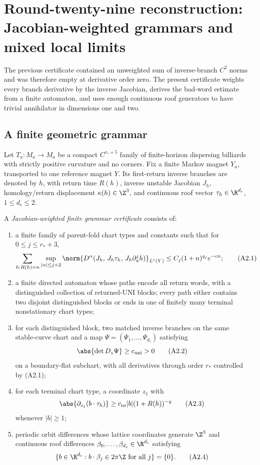 \section{Round-twenty-nine reconstruction: Jacobian-weighted grammars and mixed local limits}
\label{sec:r29-a2}

The previous certificate contained an unweighted sum of inverse-branch
$C^2$ norms and was therefore empty at derivative order zero.  The present
certificate weights every branch derivative by the inverse Jacobian, derives
the bad-word estimate from a finite automaton, and uses enough continuous roof
generators to have trivial annihilator in dimensions one and two.

\subsection{A finite geometric grammar}

Let $T_a:M_a\to M_a$ be a compact $C^{r_*+5}$ family of finite-horizon
dispersing billiards with strictly positive curvature and no corners.  Fix a
finite Markov magnet $Y_a$, transported to one reference magnet $Y$.  Its
first-return inverse branches are denoted by $h$, with return time $R(h)$,
inverse unstable Jacobian $J_h$, homology/return displacement
$\kappa(h)\in\Z^3$, and continuous roof vector $\tau_h\in\R^{d_c}$,
$1\le d_c\le2$.

A \emph{Jacobian-weighted finite grammar certificate} consists of:

\begin{enumerate}[label=(G\arabic*)]
\item a finite family of parent-fold chart types and constants such that for
      $0\le j\le r_*+3$,
\[
 \sum_{h:R(h)=n}\sup_{|\alpha|\le j+2}
 \norm{D^\alpha(J_h,\,J_h\tau_h,\,J_h\partial_a^jh)}_{L^1(Y)}
 \le C_j(1+n)^{q_j}e^{-cn};                               \tag{A2.1}
\]
\item a finite directed automaton whose paths encode all return words, with a
      distinguished collection of returned-UNI blocks; every path either
      contains two disjoint distinguished blocks or ends in one of finitely
      many terminal nonstationary chart types;
\item for each distinguished block, two matched inverse branches on the same
      stable-curve chart and a map
      $\Psi=(\Psi_1,\ldots,\Psi_{d_c})$ satisfying
\[
 \abs{\det D_z\Psi}\ge c_{\rm uni}>0                     \tag{A2.2}
\]
      on a boundary-flat subchart, with all derivatives through order $r_*$
      controlled by (A2.1);
\item for each terminal chart type, a coordinate $z_1$ with
\[
 \abs{\partial_{z_1}(b\cdot\tau_h)}
 \ge c_{\rm ns}|b|(1+R(h))^{-q}                           \tag{A2.3}
\]
      whenever $|b|\ge1$;
\item periodic orbit differences whose lattice coordinates generate $\Z^3$
      and continuous roof differences
      $\beta_0,\ldots,\beta_{d_c}\in\R^{d_c}$ satisfying
\[
 \{b\in\R^{d_c}:b\cdot\beta_j\in2\pi\Z
                 \text{ for all }j\}=\{0\}.              \tag{A2.4}
\]
\end{enumerate}

